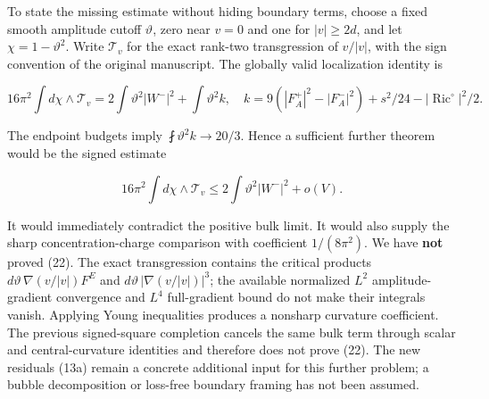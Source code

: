 To state the missing estimate without hiding boundary terms, choose a
fixed smooth amplitude cutoff \(\vartheta\), zero near \(v=0\) and one
for \(|v|\ge2d\), and let \(\chi=1-\vartheta^2\). Write \(\mathcal T_v\)
for the exact rank-two transgression of \(v/|v|\), with the sign
convention of the original manuscript. The globally valid localization
identity is

\[
 16\pi^2\int d\chi\wedge\mathcal T_v
 =2\int\vartheta^2|W^-|^2+\int\vartheta^2 k,
 \quad k=9(|F_A^+|^2-|F_A^-|^2)+s^2/24-|\operatorname{Ric}^{\circ}|^2/2.
\]

The endpoint budgets imply \(\fint\vartheta^2 k\to20/3\). Hence a
sufficient further theorem would be the signed estimate

\[
 16\pi^2\int d\chi\wedge\mathcal T_v
 \le2\int\vartheta^2|W^-|^2+o(V).
\tag{22}
\]

It would immediately contradict the positive bulk limit. It would also
supply the sharp concentration-charge comparison with coefficient
\(1/(8\pi^2)\). We have \textbf{not} proved (22). The exact
transgression contains the critical products
\(d\vartheta\,\nabla(v/|v|)F^E\) and \(d\vartheta\,|\nabla(v/|v|)|^3\);
the available normalized \(L^2\) amplitude-gradient convergence and
\(L^4\) full-gradient bound do not make their integrals vanish. Applying
Young inequalities produces a nonsharp curvature coefficient. The
previous signed-square completion cancels the same bulk term through
scalar and central-curvature identities and therefore does not prove
(22). The new residuals (13a) remain a concrete additional input for
this further problem; a bubble decomposition or loss-free boundary
framing has not been assumed.
